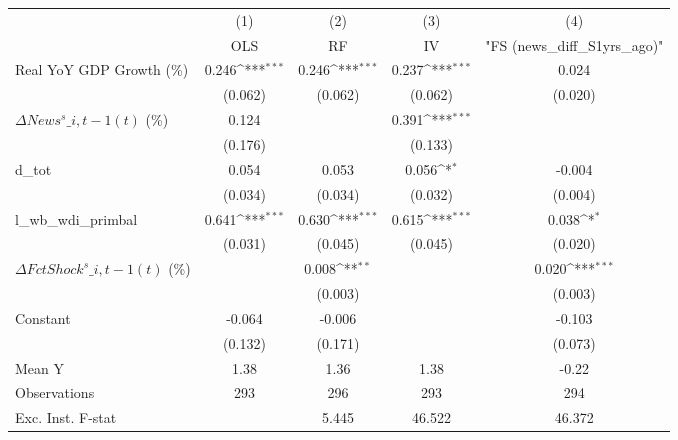 {
\def\sym#1{\ifmmode^{#1}\else\(^{#1}\)\fi}
\begin{tabular}{l*{4}{c}}
\toprule
                    &\multicolumn{1}{c}{(1)}&\multicolumn{1}{c}{(2)}&\multicolumn{1}{c}{(3)}&\multicolumn{1}{c}{(4)}\\
                    &\multicolumn{1}{c}{OLS}&\multicolumn{1}{c}{RF}&\multicolumn{1}{c}{IV}&\multicolumn{1}{c}{ "FS (news\_diff\_S1yrs\_ago)" }\\
\midrule
Real YoY GDP Growth (\%)&       0.246\sym{***}&       0.246\sym{***}&       0.237\sym{***}&       0.024         \\
                    &     (0.062)         &     (0.062)         &     (0.062)         &     (0.020)         \\
\addlinespace
$ \Delta News^s\_{i,t-1}(t)$ (\%)&       0.124         &                     &       0.391\sym{***}&                     \\
                    &     (0.176)         &                     &     (0.133)         &                     \\
\addlinespace
d\_tot               &       0.054         &       0.053         &       0.056\sym{*}  &      -0.004         \\
                    &     (0.034)         &     (0.034)         &     (0.032)         &     (0.004)         \\
\addlinespace
l\_wb\_wdi\_primbal    &       0.641\sym{***}&       0.630\sym{***}&       0.615\sym{***}&       0.038\sym{*}  \\
                    &     (0.031)         &     (0.045)         &     (0.045)         &     (0.020)         \\
\addlinespace
$ \Delta FctShock^s\_{i,t-1}(t)$ (\%)&                     &       0.008\sym{**} &                     &       0.020\sym{***}\\
                    &                     &     (0.003)         &                     &     (0.003)         \\
\addlinespace
Constant            &      -0.064         &      -0.006         &                     &      -0.103         \\
                    &     (0.132)         &     (0.171)         &                     &     (0.073)         \\
\midrule
Mean Y              &        1.38         &        1.36         &        1.38         &       -0.22         \\
Observations        &         293         &         296         &         293         &         294         \\
Exc. Inst. F-stat   &                     &       5.445         &      46.522         &      46.372         \\
\bottomrule
\end{tabular}
}

